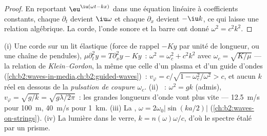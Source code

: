 \begin{proof}
En reportant $\eu^{\iu(\omega t - kx)}$ dans une équation linéaire à coefficients
constants, chaque $\partial_t$ devient $\iu\omega$ et chaque $\partial_x$ devient
$-\iu k$, ce qui laisse une relation algébrique. La corde, l'onde sonore et
la barre ont donné $\omega^2 = c^2k^2$.
\end{proof}

\begin{example}\label{ex:b2:dispersion-wave-packets:examples}
(i) Une corde sur un lit élastique (force de rappel $-Ky$ par unité de longueur,
ou une chaîne de pendules), $\mu\partial_t^2y = T\partial_x^2y - Ky$~: $\omega^2 = \omega_c^2
+ c^2k^2$ avec $\omega_c = \sqrt{K/\mu}$ --- la relation de \emph{Klein--Gordon},
la même que celle d'un plasma et d'un guide d'ondes
(\cref{ch:b2:waves-in-media,ch:b2:guided-waves})~: $v_\varphi = c/\sqrt{1 -
\omega_c^2/\omega^2} > c$, et aucun $k$ réel en dessous de la \emph{pulsation de coupure} $\omega_c$.
(ii) ~: $\omega^2 = gk$ (admis), $v_\varphi =
\sqrt{g/k} = \sqrt{g\lambda/2\pi}$~: les grandes longueurs d'onde vont plus vite --- \qty{12.5}{m/s} pour
\qty{100}{m}, \qty{40}{m/s} pour \qty{1}{km}. (iii) La , $\omega =
2\omega_0|\sin(ka/2)|$ (\cref{ch:b2:waves-on-strings}). (iv) La lumière dans le verre,
$k = n(\omega)\omega/c$, d'où le spectre étalé par un prisme.
\end{example}

